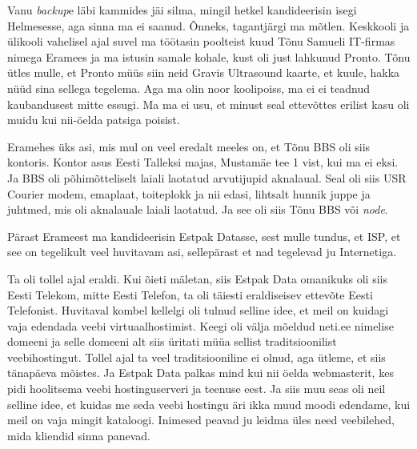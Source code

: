 Vanu \emph{backup}e läbi kammides jäi silma, mingil hetkel kandideerisin isegi 
Helmesesse, aga sinna ma ei saanud. Õnneks, tagantjärgi ma 
mõtlen. Keskkooli ja ülikooli vahelisel ajal suvel ma töötasin poolteist kuud 
Tõnu Samueli IT-firmas nimega Eramees 
ja ma istusin samale kohale, kust oli just lahkunud Pronto.  
 Tõnu ütles mulle, et Pronto müüs siin  neid Gravis 
Ultrasound kaarte, et kuule, hakka nüüd sina sellega tegelema. Aga ma olin 
noor koolipoiss, ma ei  ei teadnud kaubandusest mitte essugi. Ma ma ei usu, et 
minust seal ettevõttes erilist kasu oli muidu kui nii-öelda patsiga poisist. 


Eramehes üks asi, mis mul on veel eredalt meeles on, et Tõnu BBS oli siis 
kontoris. Kontor asus Eesti Talleksi majas, Mustamäe tee 1 vist, kui ma ei 
eksi. Ja BBS oli põhimõtteliselt  laiali laotatud arvutijupid  aknalaual. Seal 
oli siis USR Courier modem,  emaplaat, toiteplokk  
ja nii edasi, lihtsalt hunnik juppe ja juhtmed, mis oli aknalauale laiali 
laotatud. Ja see oli siis Tõnu BBS või \emph{node}.

Pärast Erameest ma kandideerisin Estpak Datasse, sest mulle 
tundus, et ISP, et see on tegelikult veel huvitavam asi, sellepärast et nad 
tegelevad ju Internetiga.


Ta oli tollel ajal eraldi. Kui õieti mäletan, siis Estpak Data omanikuks oli 
siis Eesti Telekom, mitte  Eesti Telefon, ta 
oli täiesti eraldiseisev ettevõte Eesti Telefonist. Huvitaval kombel kellelgi 
oli tulnud selline idee, et meil on kuidagi vaja edendada veebi  
virtuaalhostimist. Keegi oli välja mõeldud neti.ee nimelise 
domeeni ja selle domeeni alt siis üritati müüa sellist traditsioonilist 
veebihostingut. Tollel ajal ta veel traditsiooniline ei olnud, aga ütleme, et 
siis tänapäeva mõistes. Ja  Estpak Data palkas mind kui nii öelda webmasterit, 
kes pidi hoolitsema veebi hostinguserveri ja teenuse eest. Ja siis muu seas oli 
neil selline idee, et kuidas me seda veebi hostingu äri ikka muud moodi 
edendame, kui meil on vaja mingit kataloogi. Inimesed peavad ju leidma üles 
need veebilehed, mida  kliendid sinna panevad.

